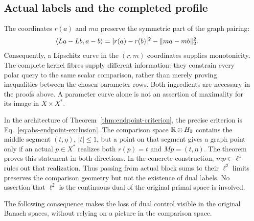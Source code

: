 \subsection{Actual labels and the completed profile}
The coordinates $r(a)$ and $ma$ preserve the symmetric part of the graph
pairing:
\[
\langle La-Lb,a-b\rangle=|r(a)-r(b)|^2-\|ma-mb\|_2^2.
\]
Consequently, a Lipschitz curve in the $(r,m)$ coordinates supplies
monotonicity. The complete kernel fibres supply different information:
they constrain every polar query to the same scalar comparison, rather
than merely proving inequalities between the chosen parameter rows.
Both ingredients are necessary in the proofs above. A parameter curve
alone is not an assertion of maximality for its image in $X\times X^*$.

In the architecture of Theorem~\ref{thm:endpoint-criterion}, the precise
criterion is Eq.~\eqref{eq:abs-endpoint-exclusion}. The comparison space
$\mathbb R\oplus H_0$ contains the middle segment $(t,\eta)$, $|t|\le1$,
but a point on that segment gives a graph point only if an actual
$p\in X^*$ realizes both $r(p)=t$ and $Mp=(t,\eta)$. The theorem proves
this statement in both directions. In the concrete construction,
$mp\in\ell^1$ rules out that realization. Thus passing from actual
block sums to their $\ell^2$ limits preserves the comparison geometry
but not the existence of dual labels. No assertion that $\ell^2$ is
the continuous dual of the original primal space is involved.

The following consequence makes the loss of dual control visible in
the original Banach spaces, without relying on a picture in the
comparison space.


